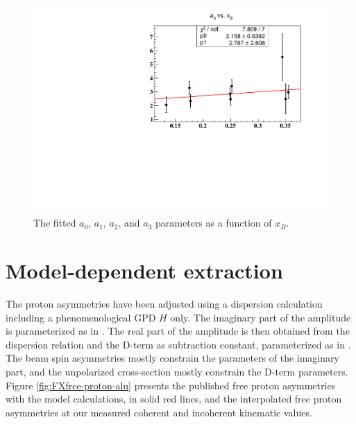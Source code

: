 \begin{figure}[tpb]
\hspace{1.7cm}
\includegraphics[scale=0.37]{fig_updated/test_a3.pdf}
\caption{The fitted $a_0$, $a_1$, $a_2$, and $a_3$ parameters as a function of 
$x_B$.}
\label{fig:fitted-points-xB}
\end{figure}

\section{Model-dependent extraction} \label{model_int}
The proton asymmetries have been adjusted using a dispersion calculation 
including a phenomenological GPD $H$ only. The imaginary part of the amplitude 
is parameterized as in \cite{GPD_cal_free_p}. The real part of the amplitude is 
then obtained from the dispersion relation and the D-term as subtraction 
constant, parameterized as in \cite{GPD_cal_free_p}. The beam spin asymmetries 
mostly constrain the parameters of the imaginary part, and the unpolarized 
cross-section mostly constrain the D-term parameters. Figure 
\ref{fig:FXfree-proton-alu} presents the published free proton asymmetries with 
the model calculations, in solid red lines, and the interpolated free proton 
asymmetries at our measured coherent and incoherent kinematic values.

